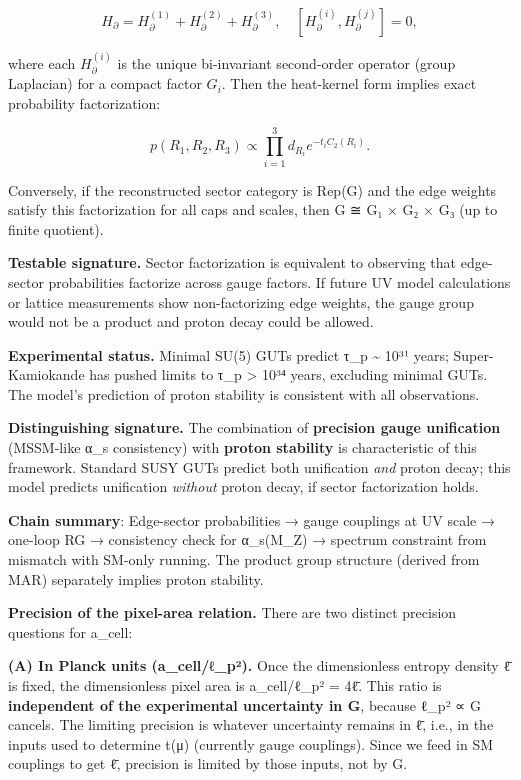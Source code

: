 \documentclass[
]{article}
\begin{document}
\[
H_{\partial} = H^{(1)}_{\partial} + H^{(2)}_{\partial} + H^{(3)}_{\partial},
\quad [H^{(i)}_{\partial}, H^{(j)}_{\partial}] = 0,
\]

where each \(H^{(i)}_{\partial}\) is the unique bi-invariant
second-order operator (group Laplacian) for a compact factor \(G_i\).
Then the heat-kernel form implies exact probability factorization:

\[
p(R_1, R_2, R_3) \propto \prod_{i=1}^3 d_{R_i} e^{-t_i C_2(R_i)}.
\]

Conversely, if the reconstructed sector category is Rep(G) and the edge
weights satisfy this factorization for all caps and scales, then G ≅ G₁
× G₂ × G₃ (up to finite quotient).

\textbf{Testable signature.} Sector factorization is equivalent to
observing that edge-sector probabilities factorize across gauge factors.
If future UV model calculations or lattice measurements show
non-factorizing edge weights, the gauge group would not be a product and
proton decay could be allowed.

\textbf{Experimental status.} Minimal SU(5) GUTs predict τ\_p
\textasciitilde{} 10³¹ years; Super-Kamiokande has pushed limits to τ\_p
\textgreater{} 10³⁴ years, excluding minimal GUTs. The model's
prediction of proton stability is consistent with all observations.

\textbf{Distinguishing signature.} The combination of \textbf{precision
gauge unification} (MSSM-like α\_s consistency) with \textbf{proton
stability} is characteristic of this framework. Standard SUSY GUTs
predict both unification \emph{and} proton decay; this model predicts
unification \emph{without} proton decay, if sector factorization holds.

\textbf{Chain summary}: Edge-sector probabilities → gauge couplings at
UV scale → one-loop RG → consistency check for α\_s(M\_Z) → spectrum
constraint from mismatch with SM-only running. The product group
structure (derived from MAR) separately implies proton stability.

\textbf{Precision of the pixel-area relation.} There are two distinct
precision questions for a\_cell:

\textbf{(A) In Planck units (a\_cell/ℓ\_p²).} Once the dimensionless
entropy density ℓ̄ is fixed, the dimensionless pixel area is
a\_cell/ℓ\_p² = 4ℓ̄. This ratio is \textbf{independent of the
experimental uncertainty in G}, because ℓ\_p² ∝ G cancels. The limiting
precision is whatever uncertainty remains in ℓ̄, i.e., in the inputs used
to determine t(μ) (currently gauge couplings). Since we feed in SM
couplings to get ℓ̄, precision is limited by those inputs, not by G.
\end{document}
